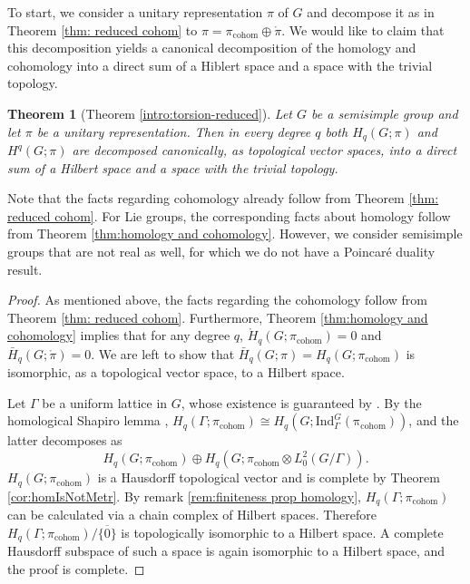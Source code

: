 \documentclass[12pt,reqno]{amsart}
\newtheorem{theorem}{Theorem}[section]
\theoremstyle{definition}
\newcommand{\torH}{\mathring{H}}
\begin{document}
To start, we consider a unitary representation $\pi$ of $G$ and decompose it as in Theorem \ref{thm: reduced cohom} to $\pi=\pi_\mathrm{cohom} \oplus \mathring{\pi}$. We would like to claim that this decomposition yields a canonical decomposition of the homology and cohomology into a direct sum of a Hiblert space and a space with the trivial topology.
\begin{theorem}[Theorem \ref{intro:torsion-reduced}]\label{thm:decomp-homology-cohomology}
    Let $G$ be a semisimple group and let $\pi$ be a unitary representation.
    Then in every degree $q$ both $H_q(G;\pi)$ and $H^q(G;\pi)$ are decomposed canonically, as topological vector spaces, into a direct sum of a Hilbert space and a space with the trivial topology. 
\end{theorem}
Note that the facts regarding cohomology already follow from Theorem \ref{thm: reduced cohom}. For Lie groups, the corresponding facts about homology follow from Theorem \ref{thm:homology and cohomology}. However, we consider semisimple groups that are not real as well, for which we do not have a Poincar\'e duality result.
\begin{proof}
    As mentioned above, the facts regarding the cohomology follow from Theorem \ref{thm: reduced cohom}. Furthermore, Theorem \ref{thm:homology and cohomology} implies that for any degree $q$, $\torH_q(G;\pi_\mathrm{cohom})=0$ and $\bar{H}_q(G;\mathring{\pi})=0$. We are left to show that $\bar{H}_q(G;\pi)=H_q(G;\pi_\mathrm{cohom})$ is isomorphic, as a topological vector space, to a Hilbert space.

    Let $\Gamma$ be a uniform lattice in $G$, whose existence is guaranteed by \cite[Corollary~1.12]{BorelHarder}. By the homological Shapiro lemma \cite[Lemma~C.35]{Petersen}, $H_q(\Gamma;\pi_\mathrm{cohom}) 
    \cong H_q(G;\mathrm{Ind}_\Gamma^G(\mathrm{\pi_\mathrm{cohom}}))$, and the latter decomposes as
    $$H_q(G;\pi_\mathrm{cohom}) \oplus H_q(G;\pi_\mathrm{cohom} \otimes L^2_0(G/\Gamma)).$$
     $H_q(G;\pi_\mathrm{cohom})$ is a Hausdorff topological vector and is complete by Theorem \ref{cor:homIsNotMetr}. By remark \ref{rem:finiteness prop homology}, $H_q(\Gamma;\pi_\mathrm{cohom})$ can be calculated via a chain complex of Hilbert spaces. Therefore $H_q(\Gamma;\pi_\mathrm{cohom}) / \overline{\{0\}}$ is topologically isomorphic to a Hilbert space. A complete Hausdorff subspace of such a space is again isomorphic to a Hilbert space, and the proof is complete.
\end{proof}
\end{document}
